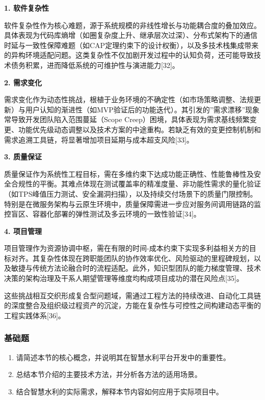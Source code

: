 \documentclass[12pt,a4paper]{article}
\providecommand{\tightlist}{%
  \setlength{\itemsep}{0pt}\setlength{\parskip}{0pt}}
\begin{document}
\textbf{1. 软件复杂性}

软件复杂性作为核心难题，源于系统规模的非线性增长与功能耦合度的叠加效应。具体表现为代码库熵增（如圈复杂度上升、继承层次过深）、分布式架构下的通信时延与一致性保障难题（如CAP定理约束下的设计权衡），以及多技术栈集成带来的异构环境适配问题。这类复杂性不仅加剧开发过程中的认知负荷，还可能导致技术债务积累，进而降低系统的可维护性与演进能力{[}32{]}。

\textbf{2. 需求变化}

需求变化作为动态性挑战，根植于业务环境的不确定性（如市场策略调整、法规更新）与用户认知的渐进性（如MVP验证后的功能迭代）。其引发的''需求漂移''现象常导致开发团队陷入范围蔓延（Scope
Creep）困境，具体表现为需求基线频繁变更、功能优先级动态调整以及技术方案的中途重构。若缺乏有效的变更控制机制和需求追溯工具链，将显著增加项目延期与成本超支风险{[}33{]}。

\textbf{3. 质量保证}

质量保证作为系统性工程目标，需在多维约束下达成功能正确性、性能鲁棒性及安全合规性的平衡。其难点体现在测试覆盖率的精准度量、非功能性需求的量化验证（如TPS峰值压力测试、安全漏洞扫描），以及持续交付场景下的质量门限控制。特别是在微服务架构与云原生环境中，质量保障需进一步应对服务间调用链路的监控盲区、容器化部署的弹性测试及多云环境的一致性验证{[}34{]}。

\textbf{4. 项目管理}

项目管理作为资源协调中枢，需在有限的时间-成本约束下实现多利益相关方的目标对齐。其复杂性体现在跨职能团队的协作效率优化、风险驱动的里程碑规划，以及敏捷与传统方法论融合时的流程适配。此外，知识型团队的能力梯度管理、技术决策的架构治理及干系人期望管理等维度均构成项目成功的潜在风险点{[}35{]}。

这些挑战相互交织形成复合型问题域，需通过工程方法的持续改进、自动化工具链的深度整合及组织级过程资产的沉淀，方能在复杂性与可控性之间构建动态平衡的工程实践体系{[}36{]}。

\subsubsection{基础题}\label{ux57faux7840ux9898-1}

\begin{enumerate}
\def\labelenumi{\arabic{enumi}.}
\tightlist
\item
  请简述本节的核心概念，并说明其在智慧水利平台开发中的重要性。
\item
  总结本节介绍的主要技术方法，并分析各方法的适用场景。
\item
  结合智慧水利的实际需求，解释本节内容如何应用于实际项目中。
\end{enumerate}
\end{document}
